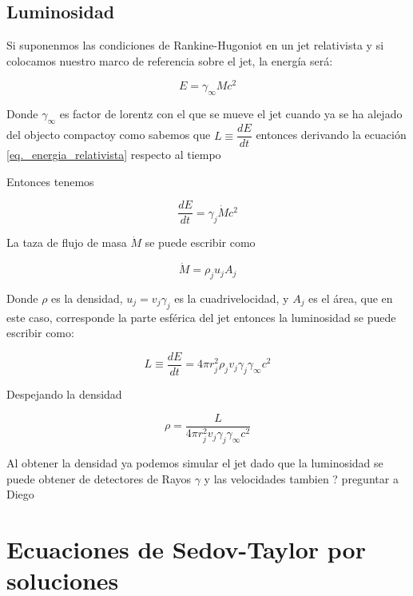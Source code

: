 \documentclass[12pt,a4paper]{book}
\begin{document}
\subsection{Luminosidad}
Si suponenmos las condiciones de Rankine-Hugoniot en un jet relativista y si colocamos nuestro marco de referencia sobre el jet, la energía será:

\begin{equation} \label{eq._energia_relativista}
  E = \gamma_{\infty} M c^2
\end{equation}

Donde $\gamma_{\infty}$ es factor de lorentz con el que se mueve el jet cuando ya se ha alejado del objecto compactoy como sabemos 
que $L \equiv \dfrac{d E}{d t}$ entonces derivando la ecuación \ref{eq._energia_relativista} respecto al tiempo

Entonces tenemos 

\begin{equation} \label{eq._luminosidad_relativista}
  \dfrac{d E}{d t} = \gamma_{j} \dot{ M }  c^2
\end{equation}

La taza de flujo de masa $\dot{M}$ se puede escribir como

\begin{equation}
  \dot{M} = \rho_j u_j A_j
\end{equation}

Donde $\rho$ es la densidad, $u_j = v_j \gamma_{j}$ es la cuadrivelocidad,  y $A_j$ es el área, que en este caso, corresponde la parte esférica del jet
entonces la luminosidad se puede escribir como:

\begin{equation}
  L \equiv \dfrac{d E}{d t} = 4\pi r_j^2 \rho_j v_j \gamma_j \gamma_{\infty} c^2
\end{equation}

Despejando la densidad

\begin{equation}
  \rho = \frac{L}{4\pi r_j^2 v_j \gamma_j \gamma_{\infty} c^2}
\end{equation}

Al obtener la densidad ya podemos simular el jet dado que la luminosidad se puede obtener de detectores de Rayos $\gamma$ y las velocidades tambien ? preguntar a 
Diego


\section{Ecuaciones de Sedov-Taylor por soluciones} \label{seccion_ecuaciones_de_sedov_taylor}
\end{document}
